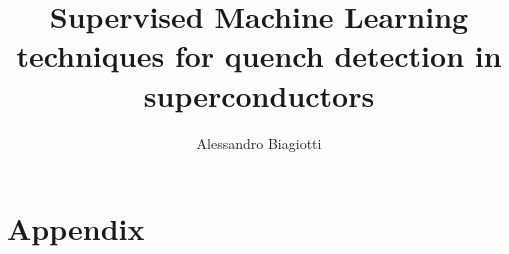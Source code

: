 \documentclass[a4paper]{book}
\title{Supervised Machine Learning techniques for quench detection in superconductors}
\author{Alessandro Biagiotti}
\begin{document}
\makefrontpage

\frontmatter

\tableofcontents

\mainmatter

\setcounter{chapter}{-1}








\part*{Appendix}
\appendix


%

\printbibliography

\closingpage
\end{document}
